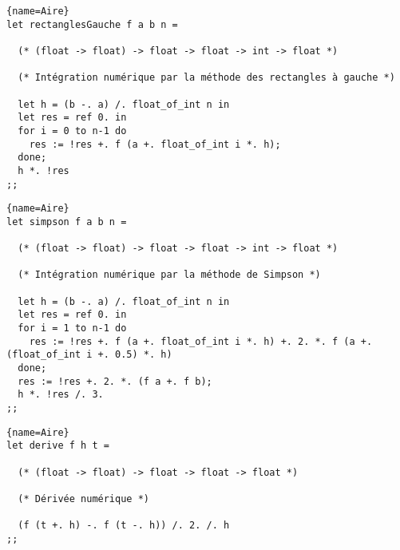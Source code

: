 \documentclass[10pt,twoside,a4paper]{article}
\begin{document}
\begin{lstlisting}{name=Aire}
let rectanglesGauche f a b n =

  (* (float -> float) -> float -> float -> int -> float *)

  (* Intégration numérique par la méthode des rectangles à gauche *)
  
  let h = (b -. a) /. float_of_int n in
  let res = ref 0. in
  for i = 0 to n-1 do
    res := !res +. f (a +. float_of_int i *. h);
  done;
  h *. !res
;;
\end{lstlisting}
\pagebreak
\begin{lstlisting}{name=Aire}
let simpson f a b n =

  (* (float -> float) -> float -> float -> int -> float *)

  (* Intégration numérique par la méthode de Simpson *)
  
  let h = (b -. a) /. float_of_int n in
  let res = ref 0. in
  for i = 1 to n-1 do
    res := !res +. f (a +. float_of_int i *. h) +. 2. *. f (a +. (float_of_int i +. 0.5) *. h)
  done;
  res := !res +. 2. *. (f a +. f b);
  h *. !res /. 3.
;;
\end{lstlisting}

\begin{lstlisting}{name=Aire}
let derive f h t =

  (* (float -> float) -> float -> float -> float *)

  (* Dérivée numérique *)
  
  (f (t +. h) -. f (t -. h)) /. 2. /. h
;;
\end{lstlisting}
\end{document}
